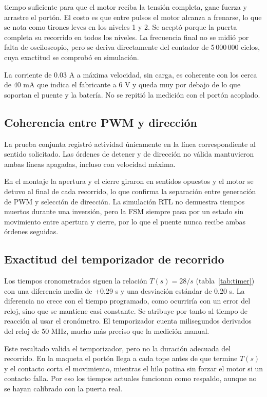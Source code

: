 \documentclass[12pt,letterpaper]{article}
\begin{document}
tiempo suficiente para que el motor reciba la tensión
completa, gane fuerza y arrastre el portón. El costo es
que entre pulsos el motor alcanza a frenarse, lo que se
nota como tirones leves en los niveles 1 y 2. Se aceptó
porque la puerta completa su recorrido en todos los
niveles. La frecuencia final no se midió por falta de
osciloscopio, pero se deriva directamente del contador
de 5\,000\,000 ciclos, cuya exactitud se comprobó en
simulación.

La corriente de 0.03 A a máxima velocidad, sin carga, es
coherente con los cerca de 40 mA que indica el fabricante
a 6 V y queda muy por debajo de lo que soportan el puente
y la batería. No se repitió la medición con el portón
acoplado.

\subsection{Coherencia entre PWM y dirección}

La prueba conjunta registró actividad únicamente en
la línea correspondiente al sentido solicitado.
Las órdenes de detener y de dirección no válida
mantuvieron ambas líneas apagadas, incluso con
velocidad máxima.

En el montaje la apertura y el cierre giraron en sentidos
opuestos y el motor se detuvo al final de cada recorrido,
lo que confirma la separación entre generación de PWM y
selección de dirección. La simulación RTL no demuestra
tiempos muertos durante una inversión, pero la FSM
siempre pasa por un estado sin movimiento entre apertura
y cierre, por lo que el puente nunca recibe ambas órdenes
seguidas.

\subsection{Exactitud del temporizador de recorrido}

Los tiempos cronometrados siguen la relación $T(s)=28/s$
(tabla~\ref{tab:timer}) con una diferencia media de
+0.29 s y una desviación estándar de 0.20 s. La diferencia
no crece con el tiempo programado, como ocurriría con un
error del reloj, sino que se mantiene casi constante. Se
atribuye por tanto al tiempo de reacción al usar el
cronómetro. El temporizador cuenta milisegundos derivados
del reloj de 50 MHz, mucho más preciso que la medición
manual.

Este resultado valida el temporizador, pero no la
duración adecuada del recorrido. En la maqueta el portón
llega a cada tope antes de que termine $T(s)$ y el
contacto corta el movimiento, mientras el hilo patina sin
forzar el motor si un contacto falla. Por eso los tiempos
actuales funcionan como respaldo, aunque no se hayan
calibrado con la puerta real.
\end{document}
